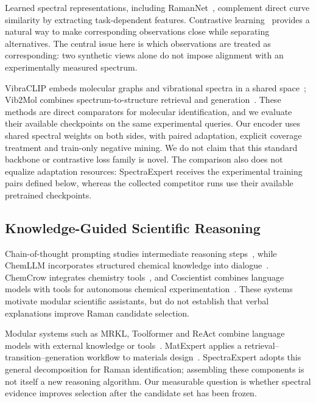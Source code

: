 \documentclass[conference]{IEEEtran}
\begin{document}
Learned spectral representations, including RamanNet~\cite{ibtehaz2023ramannet}, complement direct curve similarity by extracting task-dependent features. Contrastive learning~\cite{chen2020simple} provides a natural way to make corresponding observations close while separating alternatives. The central issue here is which observations are treated as corresponding: two synthetic views alone do not impose alignment with an experimentally measured spectrum.

VibraCLIP embeds molecular graphs and vibrational spectra in a shared space~\cite{vibraclip}; Vib2Mol combines spectrum-to-structure retrieval and generation~\cite{vib2mol}. These methods are direct comparators for molecular identification, and we evaluate their available checkpoints on the same experimental queries. Our encoder uses shared spectral weights on both sides, with paired adaptation, explicit coverage treatment and train-only negative mining. We do not claim that this standard backbone or contrastive loss family is novel. The comparison also does not equalize adaptation resources: SpectraExpert receives the experimental training pairs defined below, whereas the collected competitor runs use their available pretrained checkpoints.

\subsection{Knowledge-Guided Scientific Reasoning}
Chain-of-thought prompting studies intermediate reasoning steps~\cite{wei2022chain}, while ChemLLM incorporates structured chemical knowledge into dialogue~\cite{zhang2024chemllm}. ChemCrow integrates chemistry tools~\cite{m2024augmenting}, and Coscientist combines language models with tools for autonomous chemical experimentation~\cite{boiko2023autonomous}. These systems motivate modular scientific assistants, but do not establish that verbal explanations improve Raman candidate selection.

Modular systems such as MRKL, Toolformer and ReAct combine language models with external knowledge or tools~\cite{karpas2022mrkl,schick2023toolformer,yao2023react}. MatExpert applies a retrieval--transition--generation workflow to materials design~\cite{ICLR2025_7d6850f4}. SpectraExpert adopts this general decomposition for Raman identification; assembling these components is not itself a new reasoning algorithm. Our measurable question is whether spectral evidence improves selection after the candidate set has been frozen.
\end{document}
